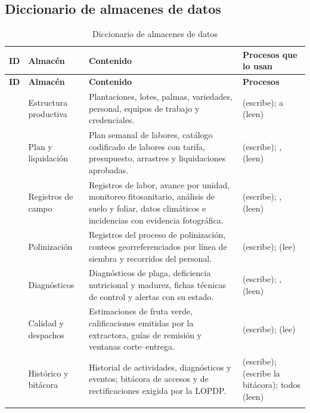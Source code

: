 \subsection{Diccionario de almacenes de datos}

\begin{longtable}{|C{1.5cm}|L{3.6cm}|L{5.6cm}|L{4.4cm}|}
\hline
{}\textbf{ID} & \textbf{Almacén} & \textbf{Contenido} & \textbf{Procesos que lo usan}\\ \hline
\endfirsthead
\hline
{}\textbf{ID} & \textbf{Almacén} & \textbf{Contenido} & \textbf{Procesos}\\ \hline
\endhead
{} & Estructura productiva & Plantaciones, lotes, palmas, variedades, personal, equipos de trabajo y credenciales. &  (escribe);  a  (leen)\\ \hline
{} & Plan y liquidación & Plan semanal de labores, catálogo codificado de labores con tarifa, presupuesto, arrastres y liquidaciones aprobadas. &  (escribe); ,  (leen)\\ \hline
{} & Registros de campo & Registros de labor, avance por unidad, monitoreo fitosanitario, análisis de suelo y foliar, datos climáticos e incidencias con evidencia fotográfica. &  (escribe); ,  (leen)\\ \hline
{} & Polinización & Registros del proceso de polinización, conteos georreferenciados por línea de siembra y recorridos del personal. &  (escribe);  (lee)\\ \hline
{} & Diagnósticos & Diagnósticos de plaga, deficiencia nutricional y madurez, fichas técnicas de control y alertas con su estado. &  (escribe); ,  (leen)\\ \hline
{} & Calidad y despachos & Estimaciones de fruta verde, calificaciones emitidas por la extractora, guías de remisión y ventanas corte--entrega. &  (escribe);  (lee)\\ \hline
{} & Histórico y bitácora & Historial de actividades, diagnósticos y eventos; bitácora de accesos y de rectificaciones exigida por la LOPDP. &  (escribe);  (escribe la bitácora); todos (leen)\\ \hline
\caption{Diccionario de almacenes de datos}
\label{tab:dicc-almacenes}
\end{longtable}

